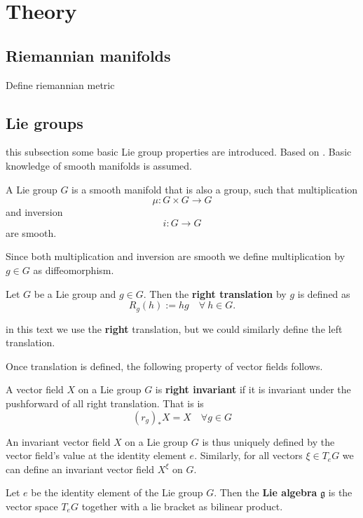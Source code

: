 
\section{Theory}
\subsection{Riemannian manifolds}
Define riemannian metric
\subsection{Lie groups}
this subsection some basic Lie group properties are introduced. Based on \cite{celledoni2016}. Basic knowledge of smooth manifolds is assumed.
\begin{definition}
  A Lie group  \(G\) is a smooth manifold that is also a group, such that multiplication
  \begin{equation}
    \mu : G \times G \rightarrow G
  \end{equation}
  and inversion
  \begin{equation}
    i : G  \rightarrow G
  \end{equation}
  are smooth.
\end{definition}
Since both  multiplication and inversion are smooth we define multiplication by  \(g \in G\) as diffeomorphism.
\begin{definition}
  Let  \(G\) be a Lie group and  \(g \in G\). Then the \textbf{right translation} by  \(g\) is defined as
  \begin{equation}
    R_g(h):= hg \quad  \forall \ h  \in G.
  \end{equation}
\end{definition}
\begin{remark}
  in this text we use the \textbf{right} translation, but we could similarly define the left translation.
\end{remark}
Once translation is defined, the following property of vector fields follows.
\begin{definition}
  A vector field  \(X\) on a Lie group  \(G\) is \textbf{right invariant} if it is invariant under the pushforward of all right translation. That is is
  \begin{equation}
    (r_g)_*X = X  \quad \forall g \in G
  \end{equation}
\end{definition}
An invariant vector field  \(X\) on a Lie group  \(G\) is thus uniquely defined by the vector field's value at the identity element  \(e\). Similarly, for all vectors  \(\xi \in T_eG\) we can define an invariant vector field   \(X^{\xi}\) on  \(G\).
\begin{definition}
  Let  \(e\) be the identity element of the Lie group  \(G\). Then the \textbf{Lie algebra}  \(\mathfrak{g}\) is the vector space  \(T_{e}G\) together with a lie bracket as bilinear product.
\end{definition}
